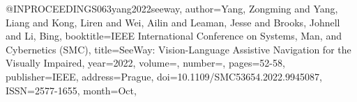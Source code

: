 @INPROCEEDINGS{063yang2022seeway,
author={Yang, Zongming and Yang, Liang and Kong, Liren and Wei, Ailin and Leaman, Jesse and Brooks, Johnell and Li, Bing},
booktitle={IEEE International Conference on Systems, Man, and Cybernetics (SMC)}, 
title={SeeWay: Vision-Language Assistive Navigation for the Visually Impaired}, 
year={2022},
volume={},
number={},
pages={52-58},
publisher={IEEE},
address={Prague},
doi={10.1109/SMC53654.2022.9945087},
ISSN={2577-1655},
month={Oct},}